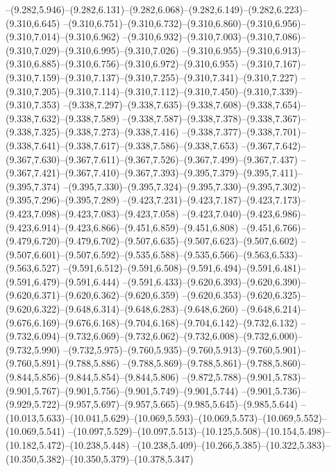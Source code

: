   --(9.282,5.946)--(9.282,6.131)--(9.282,6.068)--(9.282,6.149)--(9.282,6.223)--(9.310,6.645)%
  --(9.310,6.751)--(9.310,6.732)--(9.310,6.860)--(9.310,6.956)--(9.310,7.014)--(9.310,6.962)%
  --(9.310,6.932)--(9.310,7.003)--(9.310,7.086)--(9.310,7.029)--(9.310,6.995)--(9.310,7.026)%
  --(9.310,6.955)--(9.310,6.913)--(9.310,6.885)--(9.310,6.756)--(9.310,6.972)--(9.310,6.955)%
  --(9.310,7.167)--(9.310,7.159)--(9.310,7.137)--(9.310,7.255)--(9.310,7.341)--(9.310,7.227)%
  --(9.310,7.205)--(9.310,7.114)--(9.310,7.112)--(9.310,7.450)--(9.310,7.339)--(9.310,7.353)%
  --(9.338,7.297)--(9.338,7.635)--(9.338,7.608)--(9.338,7.654)--(9.338,7.632)--(9.338,7.589)%
  --(9.338,7.587)--(9.338,7.378)--(9.338,7.367)--(9.338,7.325)--(9.338,7.273)--(9.338,7.416)%
  --(9.338,7.377)--(9.338,7.701)--(9.338,7.641)--(9.338,7.617)--(9.338,7.586)--(9.338,7.653)%
  --(9.367,7.642)--(9.367,7.630)--(9.367,7.611)--(9.367,7.526)--(9.367,7.499)--(9.367,7.437)%
  --(9.367,7.421)--(9.367,7.410)--(9.367,7.393)--(9.395,7.379)--(9.395,7.411)--(9.395,7.374)%
  --(9.395,7.330)--(9.395,7.324)--(9.395,7.330)--(9.395,7.302)--(9.395,7.296)--(9.395,7.289)%
  --(9.423,7.231)--(9.423,7.187)--(9.423,7.173)--(9.423,7.098)--(9.423,7.083)--(9.423,7.058)%
  --(9.423,7.040)--(9.423,6.986)--(9.423,6.914)--(9.423,6.866)--(9.451,6.859)--(9.451,6.808)%
  --(9.451,6.766)--(9.479,6.720)--(9.479,6.702)--(9.507,6.635)--(9.507,6.623)--(9.507,6.602)%
  --(9.507,6.601)--(9.507,6.592)--(9.535,6.588)--(9.535,6.566)--(9.563,6.533)--(9.563,6.527)%
  --(9.591,6.512)--(9.591,6.508)--(9.591,6.494)--(9.591,6.481)--(9.591,6.479)--(9.591,6.444)%
  --(9.591,6.433)--(9.620,6.393)--(9.620,6.390)--(9.620,6.371)--(9.620,6.362)--(9.620,6.359)%
  --(9.620,6.353)--(9.620,6.325)--(9.620,6.322)--(9.648,6.314)--(9.648,6.283)--(9.648,6.260)%
  --(9.648,6.214)--(9.676,6.169)--(9.676,6.168)--(9.704,6.168)--(9.704,6.142)--(9.732,6.132)%
  --(9.732,6.094)--(9.732,6.069)--(9.732,6.062)--(9.732,6.008)--(9.732,6.000)--(9.732,5.990)%
  --(9.732,5.975)--(9.760,5.935)--(9.760,5.913)--(9.760,5.901)--(9.760,5.891)--(9.788,5.886)%
  --(9.788,5.869)--(9.788,5.861)--(9.788,5.860)--(9.844,5.856)--(9.844,5.854)--(9.844,5.806)%
  --(9.872,5.788)--(9.901,5.783)--(9.901,5.767)--(9.901,5.756)--(9.901,5.749)--(9.901,5.744)%
  --(9.901,5.736)--(9.929,5.722)--(9.957,5.697)--(9.957,5.665)--(9.985,5.645)--(9.985,5.644)%
  --(10.013,5.633)--(10.041,5.629)--(10.069,5.593)--(10.069,5.573)--(10.069,5.552)--(10.069,5.541)%
  --(10.097,5.529)--(10.097,5.513)--(10.125,5.508)--(10.154,5.498)--(10.182,5.472)--(10.238,5.448)%
  --(10.238,5.409)--(10.266,5.385)--(10.322,5.383)--(10.350,5.382)--(10.350,5.379)--(10.378,5.347)%
